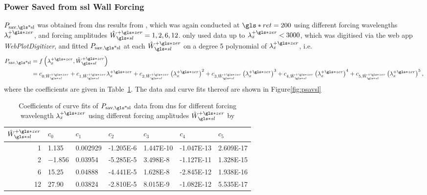 \subsubsection{Power Saved from \gls*{ssl} Wall Forcing}
$P_\text{sav,\gls*{sl}} $ was obtained from \gls*{dns} results from \textcite{viotti2009}, which was again conducted at $\gls*{ret}=200$ using different forcing wavelengths $\lambda_x\pz$, and forcing amplitudes $\hat{W}\pz\ssl=1,2,6,12$. \textcite{chernyshenko2013} only used data up to $\lambda_x\pz<3000$, which was digitised via the web app \textit{WebPlotDigitizer}, and fitted $P_\text{sav,\gls*{sl}}$ at each $\hat{W}\pz\ssl$ on a degree 5 polynomial of $\lambda_x\pz$, i.e.
\begin{align}
	P_\text{sav,\gls*{sl}} &= f\left(\lambda_x\pz,\hat{W}\pz\ssl\right)\\
			       &= c_{0,\hat{W}\pz\ssl} + c_{1,\hat{W}\pz\ssl}\lambda_x\pz+c_{2,\hat{W}\pz\ssl}\left(\lambda_x\pz\right)^{2}+c_{3,\hat{W}\pz\ssl}\left(\lambda_x\pz\right)^{3}+c_{4,\hat{W}\pz\ssl}\left(\lambda_x\pz\right)^{4}+c_{5,\hat{W}\pz\ssl}\left(\lambda_x\pz\right)^{5}\label{eq:psavsl}
,\end{align}
where the coefficients are given in Table~\ref{tab:psavslcoeff}. The data and curve fits thereof are shown in Figure\ref{fig:psavsl}
\begin{table}[htbp]
	\centering
	\begin{tabular}{r|llllll}
		$\hat{W}\pz\ssl$ & $c_0$ & $c_1$ & $c_2$ & $c_3$ & $c_4$ & $c_5$\\
		\hline
		1 & \num{1.135} &  \num{0.002929} &  \num{-1.205E-6} &  \num{1.447E-10} &  \num{-1.047E-13} &  \num{2.609E-17}\\
		2 & \num{-1.856} &  \num{0.03954} &  \num{-5.285E-5} &  \num{3.498E-8} &  \num{-1.127E-11} &  \num{1.328E-15}\\
		6 & \num{15.25} &  \num{0.04888} &  \num{-4.441E-5} &  \num{1.628E-8} &  \num{-2.845E-12} &  \num{1.938E-16}\\
		12 & \num{27.90} &  \num{0.03824} &  \num{-2.810E-5} &  \num{8.015E-9} &  \num{-1.082E-12} &  \num{5.535E-17}
	\end{tabular}
	\caption[Coefficients of curvefits of $P_\text{sav,\gls*{sl}} $]{Coefficients of curve fits of $P_\text{sav,\gls*{sl}} $ data from \gls*{dns} for different forcing wavelength $\lambda_x\pz$ using different forcing amplitudes $\hat{W}\pz\ssl$ by \textcite{viotti2009}}
	\label{tab:psavslcoeff}
\end{table}


